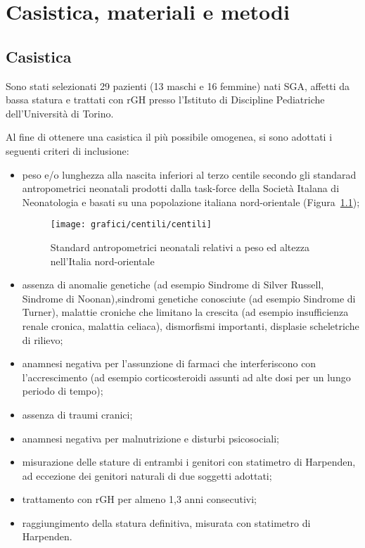\chapter{Casistica, materiali e metodi}

\section{Casistica}

Sono stati selezionati 29 pazienti (13 maschi e 16 femmine) nati SGA, affetti da bassa statura e trattati con rGH presso l'Istituto di Discipline Pediatriche dell'Università  di Torino.

Al fine di ottenere una casistica il più possibile omogenea, si sono adottati i seguenti criteri di inclusione:

\begin{itemize}
\item peso e/o lunghezza alla nascita inferiori al terzo centile secondo gli standarad antropometrici neonatali prodotti dalla task-force della Società Italana di Neonatologia e basati su una popolazione italiana nord-orientale (Figura~\ref{fig:StandardNeonataliNordOccidentali});
\begin{figure}[!h]
  \begin{center}
      \texttt{[image: grafici/centili/centili]} %
  \end{center}
  \caption{Standard antropometrici neonatali relativi a peso ed altezza nell'Italia nord-orientale}%
  \label{fig:StandardNeonataliNordOccidentali}
\end{figure}
\item assenza di anomalie genetiche (ad esempio Sindrome di Silver Russell, Sindrome di Noonan),sindromi genetiche conosciute (ad esempio Sindrome di Turner), malattie croniche che limitano la crescita (ad esempio insufficienza renale cronica, malattia celiaca), dismorfismi importanti, displasie scheletriche di rilievo;
 \item anamnesi negativa per l'assunzione di farmaci che interferiscono con l'accrescimento (ad esempio corticosteroidi assunti ad alte dosi per un lungo periodo di tempo);
 \item assenza di traumi cranici;
 \item anamnesi negativa per malnutrizione e disturbi psicosociali;
 \item misurazione delle stature di entrambi i genitori con statimetro di Harpenden, ad eccezione dei genitori naturali di due soggetti adottati;
\item trattamento con rGH per almeno 1,3 anni consecutivi;
\item raggiungimento della statura definitiva, misurata con statimetro di Harpenden. 
\end{itemize}

